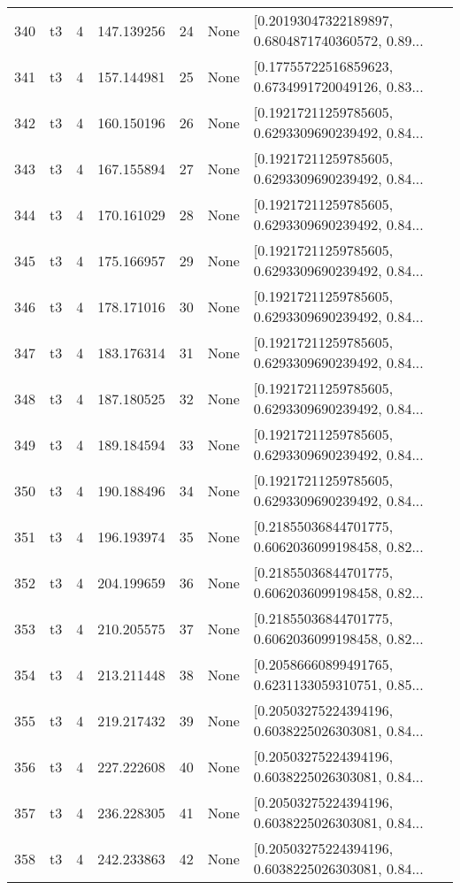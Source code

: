 \begin{tabular}{lllrlll}
340 &  t3 &   4 &  147.139256 &   24 &  None &  [0.20193047322189897, 0.6804871740360572, 0.89... \\
341 &  t3 &   4 &  157.144981 &   25 &  None &  [0.17755722516859623, 0.6734991720049126, 0.83... \\
342 &  t3 &   4 &  160.150196 &   26 &  None &  [0.19217211259785605, 0.6293309690239492, 0.84... \\
343 &  t3 &   4 &  167.155894 &   27 &  None &  [0.19217211259785605, 0.6293309690239492, 0.84... \\
344 &  t3 &   4 &  170.161029 &   28 &  None &  [0.19217211259785605, 0.6293309690239492, 0.84... \\
345 &  t3 &   4 &  175.166957 &   29 &  None &  [0.19217211259785605, 0.6293309690239492, 0.84... \\
346 &  t3 &   4 &  178.171016 &   30 &  None &  [0.19217211259785605, 0.6293309690239492, 0.84... \\
347 &  t3 &   4 &  183.176314 &   31 &  None &  [0.19217211259785605, 0.6293309690239492, 0.84... \\
348 &  t3 &   4 &  187.180525 &   32 &  None &  [0.19217211259785605, 0.6293309690239492, 0.84... \\
349 &  t3 &   4 &  189.184594 &   33 &  None &  [0.19217211259785605, 0.6293309690239492, 0.84... \\
350 &  t3 &   4 &  190.188496 &   34 &  None &  [0.19217211259785605, 0.6293309690239492, 0.84... \\
351 &  t3 &   4 &  196.193974 &   35 &  None &  [0.21855036844701775, 0.6062036099198458, 0.82... \\
352 &  t3 &   4 &  204.199659 &   36 &  None &  [0.21855036844701775, 0.6062036099198458, 0.82... \\
353 &  t3 &   4 &  210.205575 &   37 &  None &  [0.21855036844701775, 0.6062036099198458, 0.82... \\
354 &  t3 &   4 &  213.211448 &   38 &  None &  [0.20586660899491765, 0.6231133059310751, 0.85... \\
355 &  t3 &   4 &  219.217432 &   39 &  None &  [0.20503275224394196, 0.6038225026303081, 0.84... \\
356 &  t3 &   4 &  227.222608 &   40 &  None &  [0.20503275224394196, 0.6038225026303081, 0.84... \\
357 &  t3 &   4 &  236.228305 &   41 &  None &  [0.20503275224394196, 0.6038225026303081, 0.84... \\
358 &  t3 &   4 &  242.233863 &   42 &  None &  [0.20503275224394196, 0.6038225026303081, 0.84... \\

\end{tabular}
